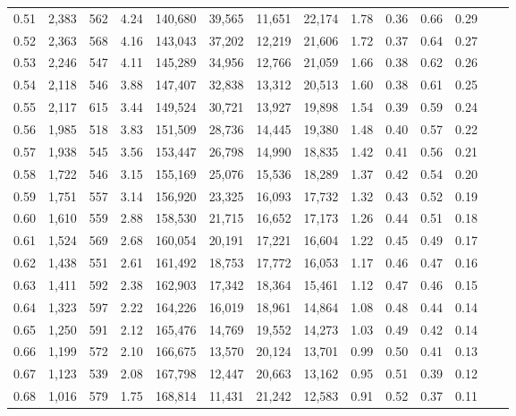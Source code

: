 \begin{tabular}{rrrrrrrrrrrrrr}
0.51 &  2,383 &  562 &    4.24 &  140,680 &   39,565 &  11,651 &  22,174 &  1.78 &  0.36 &  0.66 &      0.29 \\
0.52 &  2,363 &  568 &    4.16 &  143,043 &   37,202 &  12,219 &  21,606 &  1.72 &  0.37 &  0.64 &      0.27 \\
0.53 &  2,246 &  547 &    4.11 &  145,289 &   34,956 &  12,766 &  21,059 &  1.66 &  0.38 &  0.62 &      0.26 \\
0.54 &  2,118 &  546 &    3.88 &  147,407 &   32,838 &  13,312 &  20,513 &  1.60 &  0.38 &  0.61 &      0.25 \\
0.55 &  2,117 &  615 &    3.44 &  149,524 &   30,721 &  13,927 &  19,898 &  1.54 &  0.39 &  0.59 &      0.24 \\
0.56 &  1,985 &  518 &    3.83 &  151,509 &   28,736 &  14,445 &  19,380 &  1.48 &  0.40 &  0.57 &      0.22 \\
0.57 &  1,938 &  545 &    3.56 &  153,447 &   26,798 &  14,990 &  18,835 &  1.42 &  0.41 &  0.56 &      0.21 \\
0.58 &  1,722 &  546 &    3.15 &  155,169 &   25,076 &  15,536 &  18,289 &  1.37 &  0.42 &  0.54 &      0.20 \\
0.59 &  1,751 &  557 &    3.14 &  156,920 &   23,325 &  16,093 &  17,732 &  1.32 &  0.43 &  0.52 &      0.19 \\
0.60 &  1,610 &  559 &    2.88 &  158,530 &   21,715 &  16,652 &  17,173 &  1.26 &  0.44 &  0.51 &      0.18 \\
0.61 &  1,524 &  569 &    2.68 &  160,054 &   20,191 &  17,221 &  16,604 &  1.22 &  0.45 &  0.49 &      0.17 \\
0.62 &  1,438 &  551 &    2.61 &  161,492 &   18,753 &  17,772 &  16,053 &  1.17 &  0.46 &  0.47 &      0.16 \\
0.63 &  1,411 &  592 &    2.38 &  162,903 &   17,342 &  18,364 &  15,461 &  1.12 &  0.47 &  0.46 &      0.15 \\
0.64 &  1,323 &  597 &    2.22 &  164,226 &   16,019 &  18,961 &  14,864 &  1.08 &  0.48 &  0.44 &      0.14 \\
0.65 &  1,250 &  591 &    2.12 &  165,476 &   14,769 &  19,552 &  14,273 &  1.03 &  0.49 &  0.42 &      0.14 \\
0.66 &  1,199 &  572 &    2.10 &  166,675 &   13,570 &  20,124 &  13,701 &  0.99 &  0.50 &  0.41 &      0.13 \\
0.67 &  1,123 &  539 &    2.08 &  167,798 &   12,447 &  20,663 &  13,162 &  0.95 &  0.51 &  0.39 &      0.12 \\
0.68 &  1,016 &  579 &    1.75 &  168,814 &   11,431 &  21,242 &  12,583 &  0.91 &  0.52 &  0.37 &      0.11 \\

\end{tabular}
